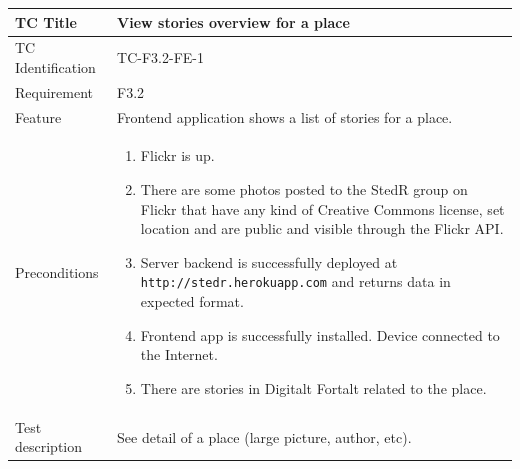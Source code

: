 \documentclass[11pt]{book}
\begin{document}
\begin{table}
  \begin{tabular}{| p{3cm} | p{9.5cm} |} \hline 
    TC Title              & View stories overview for a place \\ \hline 
    TC Identification     & TC-F3.2-FE-1 \\ \hline 
    Requirement           & F3.2 \\ \hline 
    Feature               & Frontend application shows a list of stories for a place. \\ \hline 
    Preconditions         & \begin{enumerate}
                              \item Flickr is up.
                              \item There are some photos posted to the StedR group on Flickr that have any kind of
                               Creative Commons license, set location and are public and visible through the Flickr API.
                              \item Server backend is successfully deployed at \texttt{http://stedr.herokuapp.com} and returns data in expected format.
                              \item Frontend app is successfully installed. Device connected to the Internet.
                              \item There are stories in Digitalt Fortalt related to the place.
                            \end{enumerate} \\ \hline 

    Test description      & See detail of a place (large picture, author, etc).


\end{tabular}
\end{table}
\end{document}
